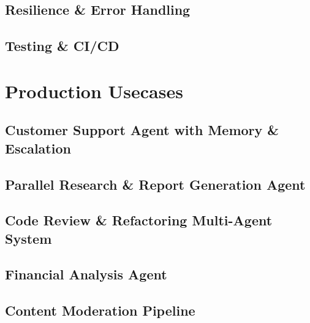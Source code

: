 \chapter{Resilience \& Error Handling}
\label{ch:resilience}


\chapter{Testing \& CI/CD}
\label{ch:testing}



\part{Production Usecases}
\label{part:usecases}

\chapter{Customer Support Agent with Memory \& Escalation}
\label{ch:usecase-support}


\chapter{Parallel Research \& Report Generation Agent}
\label{ch:usecase-research}


\chapter{Code Review \& Refactoring Multi-Agent System}
\label{ch:usecase-code-review}


\chapter{Financial Analysis Agent}
\label{ch:usecase-finance}


\chapter{Content Moderation Pipeline}
\label{ch:usecase-moderation}


